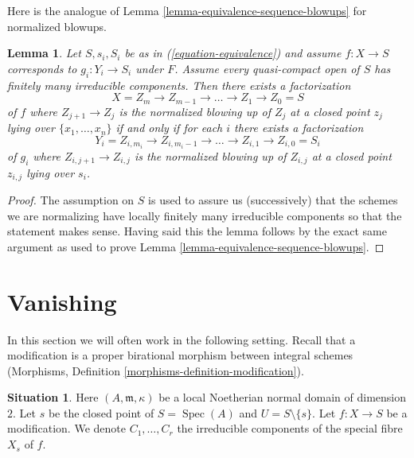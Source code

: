 \documentclass{stacks-project}
\theoremstyle{plain}
\newtheorem{lemma}[subsection]{Lemma}
\theoremstyle{definition}
\newtheorem{situation}[subsection]{Situation}
\theoremstyle{remark}
\numberwithin{equation}{subsection}
\def\Spec{\mathop{\mathrm{Spec}}}
\begin{document}
\noindent
Here is the analogue of
Lemma \ref{lemma-equivalence-sequence-blowups}
for normalized blowups.

\begin{lemma}
\label{lemma-equivalence-sequence-normalized-blowups}
Let $S, s_i, S_i$ be as in (\ref{equation-equivalence})
and assume $f : X \to S$ corresponds to $g_i : Y_i \to S_i$ under $F$.
Assume every quasi-compact open of $S$ has finitely many irreducible
components.  Then there exists a factorization
$$
X = Z_m \to Z_{m - 1} \to \ldots \to Z_1 \to Z_0 = S
$$
of $f$ where $Z_{j + 1} \to Z_j$ is the normalized blowing up of $Z_j$
at a closed point $z_j$ lying over $\{x_1, \ldots, x_n\}$ if and only if
for each $i$ there exists a factorization
$$
Y_i = Z_{i, m_i} \to Z_{i, m_i - 1} \to \ldots \to Z_{i, 1} \to Z_{i, 0} = S_i
$$
of $g_i$ where $Z_{i, j + 1} \to Z_{i, j}$ is the normalized blowing up of
$Z_{i, j}$ at a closed point $z_{i, j}$ lying over $s_i$.
\end{lemma}

\begin{proof}
The assumption on $S$ is used to assure us (successively) that
the schemes we are normalizing have locally finitely many irreducible
components so that the statement makes sense. Having said this the
lemma follows by the exact same argument as used to prove
Lemma \ref{lemma-equivalence-sequence-blowups}.
\end{proof}








\section{Vanishing}
\label{section-vanishing}

\noindent
In this section we will often work in the following setting.
Recall that a modification is a proper birational morphism
between integral schemes (Morphisms, Definition
\ref{morphisms-definition-modification}).

\begin{situation}
\label{situation-vanishing}
Here $(A, \mathfrak m, \kappa)$ be a local Noetherian normal domain of
dimension $2$. Let $s$ be the closed point of $S = \Spec(A)$ and
$U = S \setminus \{s\}$. Let $f : X \to S$ be a modification.
We denote $C_1, \ldots, C_r$ the irreducible
components of the special fibre $X_s$ of $f$.
\end{situation}
\end{document}
